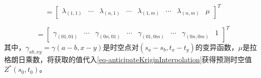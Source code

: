 \begin{equation*}
    [\lambda] = \left[ 
        \begin{array}{cccccccc}
            \lambda_{(1,1)} & \cdots & \lambda_{(n,1)} & \cdots & \lambda_{(1,m)} & \cdots & \lambda_{(n,m)} & \mu
        \end{array}
    \right]^T
\end{equation*}

\begin{equation*}
    [M] = \left[ 
        \begin{array}{cccccccc}
            \gamma_{(01,01)} & \cdots & \gamma_{(0n,01)} & \cdots & \gamma_{(01,0m)} & \cdots & \gamma_{(0n,0m)} & 1
        \end{array}
    \right]^T
\end{equation*}
其中，$\gamma_{ab,xy} = \gamma(a-b,x-y)$是时空点对$(s_a-s_b,t_x-t_y)$的变异函数，$\mu$是拉格朗日乘数，将获取的值代入\cref{eq-anticipateKriginInterpolation}获得预测时空值$Z^*(s_0,t_0)$。




















